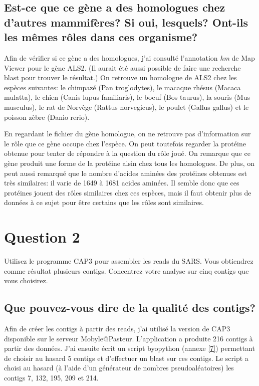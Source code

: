 \documentclass[10.8pt]{article} %
\begin{document}
\subsection[Homologues du gène ALS2]{Est-ce que ce gène a des homologues chez d'autres mammifères? Si oui, lesquels? Ont-ils les
mêmes rôles dans ces organisme?}

Afin de vérifier si ce gène a des homologues, j'ai consulté l'annotation \emph{hm} de Map Viewer pour le gène ALS2. (Il aurait
été aussi possible de faire une recherche blast pour trouver le résultat.) On retrouve un homologue de ALS2 chez les espèces suivantes:
le chimpazé (Pan troglodytes), le macaque rhésus (Macaca mulatta), le chien (Canis lupus familiaris), le boeuf (Bos taurus), la souris
(Mus musculus), le rat de Norvège (Rattus norvegicus), le poulet (Gallus gallus) et le poisson zèbre (Danio rerio). 

En regardant le fichier du gène homologue, on ne retrouve pas d'information sur le rôle que ce gène occupe
chez l'espèce. On peut toutefois regarder la protéine obtenue pour tenter de répondre à la question du rôle joué.
On remarque que ce gène produit une forme de la protéine alsin chez tous les homologues. De plus, on peut aussi remarqué
que le nombre d'acides aminées des protéines obtenues est très similaires: il varie de 1649 à 1681 acides aminées. Il semble
donc que ces protéines jouent des rôles similaires chez ces espèces, mais il faut obtenir plus de données à ce sujet pour être 
certains que les rôles sont similaires.

 
\section{Question 2} %

Utilisez le programme CAP3 pour assembler les reads du SARS. Vous obtiendrez comme résultat plusieurs contigs. Concentrez
votre analyse sur cinq contigs que vous choisirez.

\subsection[Qualité des contigs]{Que pouvez-vous dire de la qualité des contigs?}

Afin de créer les contigs à partir des reads, j'ai utilisé la version de CAP3 disponible sur le serveur Mobyle@Pasteur.
L'application a produite 216 contigs à partir des données. J'ai ensuite écrit un script byopython (annexe \ref{7}) permettant de choisir
au hasard 5 contigs et d'effectuer un blast sur ces contigs. Le script a choisi au hasard (à l'aide d'un générateur de
nombres pseudoaléatoires) les contigs 7, 132, 195, 209 et 214.
\end{document}
